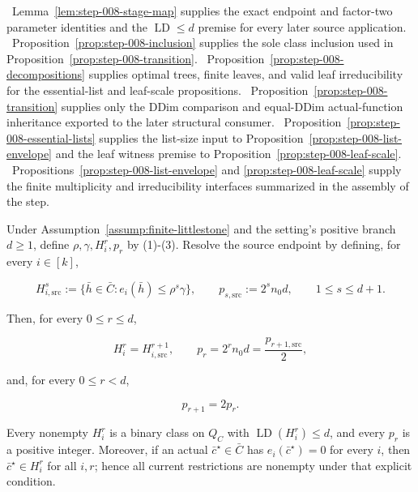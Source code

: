 \noindent\textbullet\ Lemma~\ref{lem:step-008-stage-map} supplies the exact endpoint and
  factor-two parameter identities and the \(\operatorname{LD}\le d\)
  premise for every later source application.
\noindent\textbullet\ Proposition~\ref{prop:step-008-inclusion} supplies the sole class
  inclusion used in Proposition~\ref{prop:step-008-transition}.
\noindent\textbullet\ Proposition~\ref{prop:step-008-decompositions} supplies optimal trees,
  finite leaves, and valid leaf irreducibility for the essential-list and
  leaf-scale propositions.
\noindent\textbullet\ Proposition~\ref{prop:step-008-transition} supplies only the DDim
  comparison and equal-DDim actual-function inheritance exported to the
  later structural consumer.
\noindent\textbullet\ Proposition~\ref{prop:step-008-essential-lists} supplies the list-size
  input to Proposition~\ref{prop:step-008-list-envelope} and the leaf
  witness premise to Proposition~\ref{prop:step-008-leaf-scale}.
\noindent\textbullet\ Propositions~\ref{prop:step-008-list-envelope} and
  \ref{prop:step-008-leaf-scale} supply the finite multiplicity and
  irreducibility interfaces summarized in the assembly of the step.



\begin{lemma}\label{lem:step-008-stage-map}
Under Assumption~\ref{assump:finite-littlestone} and the setting's
positive branch \(d\ge1\), define \(\rho,\gamma,H_i^r,p_r\) by (1)-(3).
Resolve the source endpoint by defining, for every \(i\in[k]\),

\[
 H_{i,\mathrm{src}}^s
 :=\{\bar h\in\bar C:e_i(\bar h)\le\rho^s\gamma\},
 \qquad
 p_{s,\mathrm{src}}:=2^s n_0d,
 \qquad 1\le s\le d+1.
\tag{14}
\]

Then, for every \(0\le r\le d\),

\[
 H_i^r=H_{i,\mathrm{src}}^{r+1},
 \qquad
 p_r=2^rn_0d=\frac{p_{r+1,\mathrm{src}}}{2},
\tag{15}
\]

and, for every \(0\le r<d\),

\[
 p_{r+1}=2p_r.
\tag{16}
\]

Every nonempty \(H_i^r\) is a binary class on \(Q_C\) with
\(\operatorname{LD}(H_i^r)\le d\), and every \(p_r\) is a positive integer.
Moreover, if an actual \(\bar c^\star\in\bar C\) has
\(e_i(\bar c^\star)=0\) for every \(i\), then
\(\bar c^\star\in H_i^r\) for all \(i,r\); hence all current restrictions
are nonempty under that explicit condition.


\end{lemma}

